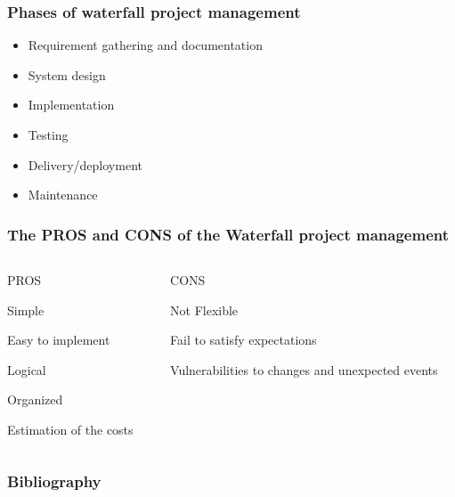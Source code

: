 \documentclass{beamer}
\begin{document}
\begin{frame}
    \frametitle{Phases of waterfall project management}
    \begin{itemize}
        \setlength\itemsep{1em}
        \item Requirement gathering and documentation \pause
        \item System design \pause
        \item Implementation \pause
        \item Testing \pause
        \item Delivery/deployment \pause
        \item Maintenance
    \end{itemize}
\end{frame}

\begin{frame}
    
    \frametitle{The PROS and CONS of the Waterfall project management}
    \begin{itemize}
    \begin{columns}[T] %
        \begin{column}{.48\textwidth}
        PROS \pause
        \item Simple 
        \item Easy to implement 
        \item Logical 
        \item Organized 
        \item Estimation of the costs 
        \end{column}%
        \hfill%
        \begin{column}{.48\textwidth}
        CONS \pause
        \item Not Flexible
        \item Fail to satisfy expectations 
        \item Vulnerabilities to changes and unexpected events
        \end{column}%
        \end{columns}   
        \setlength\itemsep{1em}
        
        
    \end{itemize}
\end{frame}

\nocite{*}
\begin{frame}
    \frametitle{Bibliography}

    
    

\end{frame}
\end{document}
